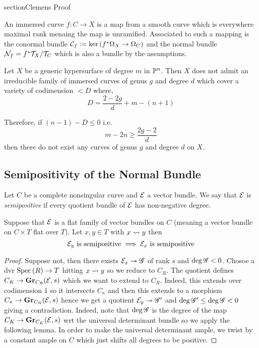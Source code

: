 \documentclass[12pt]{article}
\newcommand{\cN}{\mathcal{N}}
\begin{document}
section{Clemens Proof}


\begin{defn}
An immersed curve $f : C \to X$ is a map from a smooth curve which is everywhere maximal rank menaing the map is unramified. Associated to such a mapping is the conormal bundle $\C_f := \ker{(f^* \Omega_X \to \Omega_C)}$ and the normal bundle $\cN_f = f^* \T_X / \T_C$ which is also a bundle by the assumptions.
\end{defn}

\begin{theorem}
Let $X$ be a generic hypersurface of degree $m$ in $\P^n$. Then $X$ does not admit an irreducible family of immersed curves of genus $g$ and degree $d$ which cover a variety of codimension $< D$ where,
\[ D = \frac{2 - 2 g}{d} + m - (n+1) \]
\end{theorem}

\begin{cor}
Therefore, if $(n-1) - D \le 0$ i.e.
\[ m - 2 n \ge \frac{2g - 2}{d} \]
then there do not exist any curves of genus $g$ and degree $d$ on $X$.
\end{cor}


\subsection{Semipositivity of the Normal Bundle}

\newcommand{\Gr}{\mathbf{Gr}}

\begin{defn}
Let $C$ be a complete nonsingular curve and $\E$ a vector bundle. We say that $\E$ is \textit{semipositive} if every quotient bundle of $\E$ has non-negative degree.
\end{defn}

\begin{lemma}
Suppose that $\E$ is a flat family of vector bundles on $C$ (meaning a vector bundle on $C \times T$ flat over $T$). Let $x, y \in T$ with $x \spto y$ then
\[ \E_y \text{ is semipositive} \implies \E_x \text{ is semipositive} \]
\end{lemma}

\begin{proof}
Suppose not, then there exists $\E_x \onto \G$ of rank $s$ and $\deg{\G} < 0$. Chosoe a dvr $\Spec{R} \to T$ hitting $x \spto y$ so we reduce to $C_R$. The quotient defines $C_K \to \Gr_{C_R}(\E, s)$ which we want to extend to $C_R$. Indeed, this extends over codimension $1$ so it intersects $C_\kappa$ and then this extends to a morphism $C_\kappa \to \Gr_{C_R}(\E, s)$ hence we get a quotient $\E_y \onto \G'$ and $\deg{\G'} \le \deg{\G} < 0$ giving a contradiction. Indeed, note that $\deg{\G}$ is the degree of the map $C_K \to \Gr_{C_K}(\E, s)$ wrt the universal determinant bundle so we apply the following lemma. In order to make the universal determinant ample, we twist by a constant ample on $C$ which just shifts all degrees to be positive.
\end{proof}
\end{document}
